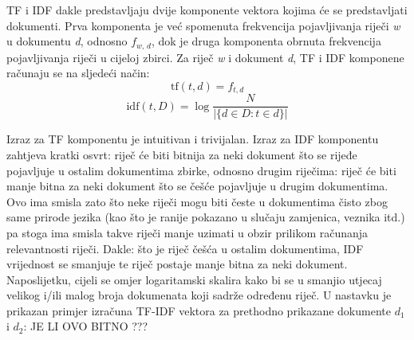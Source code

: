 \documentclass[times, utf8, zavrsni]{fer}
\begin{document}
TF i IDF dakle predstavljaju dvije komponente vektora kojima će se predstavljati dokumenti. Prva komponenta je već spomenuta frekvencija pojavljivanja riječi \textit{w} u dokumentu \textit{d}, odnosno $f_\textit{w, d}$, dok je druga komponenta obrnuta frekvencija pojavljivanja riječi u cijeloj zbirci.
Za riječ \textit{w} i dokument \textit{d}, TF i IDF komponene računaju se na sljedeći način:
\begin{equation}
{\displaystyle \mathrm {tf} (t,d)=f_{t,d}}
\end{equation}
\begin{equation}
{\displaystyle \mathrm {idf} (t,D)=\log {\frac {N}{|\{d\in D:t\in d\}|}}}
\end{equation}

Izraz za TF komponentu je intuitivan i trivijalan. Izraz za IDF komponentu zahtjeva kratki osvrt: riječ će biti bitnija za neki dokument što se rijeđe pojavljuje u ostalim dokumentima zbirke, odnosno drugim riječima: riječ će biti manje bitna za neki dokument što se češće pojavljuje u drugim dokumentima. Ovo ima smisla zato što neke riječi mogu biti česte u dokumentima čisto zbog same prirode jezika (kao što je ranije pokazano u slučaju zamjenica, veznika itd.) pa stoga ima smisla takve riječi manje uzimati u obzir prilikom računanja relevantnosti riječi. Dakle: što je riječ češća u ostalim dokumentima, IDF vrijednost se smanjuje te riječ postaje manje bitna za neki dokument. Naposlijetku, cijeli se omjer logaritamski skalira kako bi se u smanjio utjecaj velikog i/ili malog broja dokumenata koji sadrže određenu riječ. U nastavku je prikazan primjer izračuna TF-IDF vektora za prethodno prikazane dokumente ${d_1}$ i ${d_2}$: JE LI OVO BITNO ???
\end{document}
